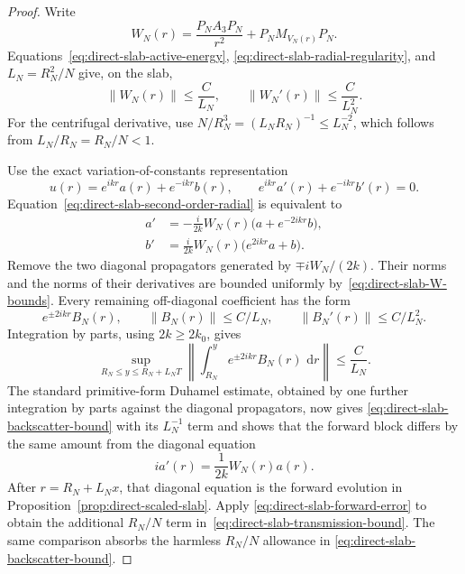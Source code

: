 \documentclass[11pt]{article}
\theoremstyle{remark}
\newcommand{\dd}{\,\mathrm d}
\begin{document}
\begin{proof}
Write
\[
 W_N(r)=\frac{P_NA_3P_N}{r^2}+P_NM_{V_N(r)}P_N.
\]
Equations~\eqref{eq:direct-slab-active-energy},
\eqref{eq:direct-slab-radial-regularity}, and
$L_N=R_N^2/N$ give, on the slab,
\begin{equation}
 \|W_N(r)\|\leq\frac{C}{L_N},
 \qquad
 \|W_N'(r)\|\leq\frac{C}{L_N^2}.
 \label{eq:direct-slab-W-bounds}
\end{equation}
For the centrifugal derivative, use
$N/R_N^3=(L_NR_N)^{-1}\leq L_N^{-2}$, which follows from
$L_N/R_N=R_N/N<1$.

Use the exact variation-of-constants representation
\[
 u(r)=e^{ikr}a(r)+e^{-ikr}b(r),
 \qquad
 e^{ikr}a'(r)+e^{-ikr}b'(r)=0.
\]
Equation~\eqref{eq:direct-slab-second-order-radial} is equivalent to
\begin{align*}
 a'&=-\frac{i}{2k}W_N(r)
       \bigl(a+e^{-2ikr}b\bigr),\\
 b'&=\frac{i}{2k}W_N(r)
       \bigl(e^{2ikr}a+b\bigr).
 \end{align*}
Remove the two diagonal propagators generated by
$\mp iW_N/(2k)$.  Their norms and the norms of their derivatives are bounded
uniformly by~\eqref{eq:direct-slab-W-bounds}.  Every remaining off-diagonal
coefficient has the form
\[
 e^{\pm2ikr}B_N(r),
 \qquad
 \|B_N(r)\|\leq C/L_N,
 \qquad
 \|B_N'(r)\|\leq C/L_N^2.
\]
Integration by parts, using $2k\geq2k_0$, gives
\[
 \sup_{R_N\leq y\leq R_N+L_NT}
 \left\|
  \int_{R_N}^{y}e^{\pm2ikr}B_N(r)\,\dd r
 \right\|
 \leq \frac{C}{L_N}.
\]
The standard primitive-form Duhamel estimate, obtained by one further
integration by parts against the diagonal propagators, now gives
\eqref{eq:direct-slab-backscatter-bound} with its $L_N^{-1}$ term and shows
that the forward block differs by the same amount from the diagonal equation
\[
 i a'(r)=\frac1{2k}W_N(r)a(r).
\]
After $r=R_N+L_Nx$, that diagonal equation is the forward evolution in
Proposition~\ref{prop:direct-scaled-slab}.  Apply
\eqref{eq:direct-slab-forward-error} to obtain the additional $R_N/N$ term
in~\eqref{eq:direct-slab-transmission-bound}.  The same comparison absorbs
the harmless $R_N/N$ allowance in
\eqref{eq:direct-slab-backscatter-bound}.
\end{proof}
\end{document}
